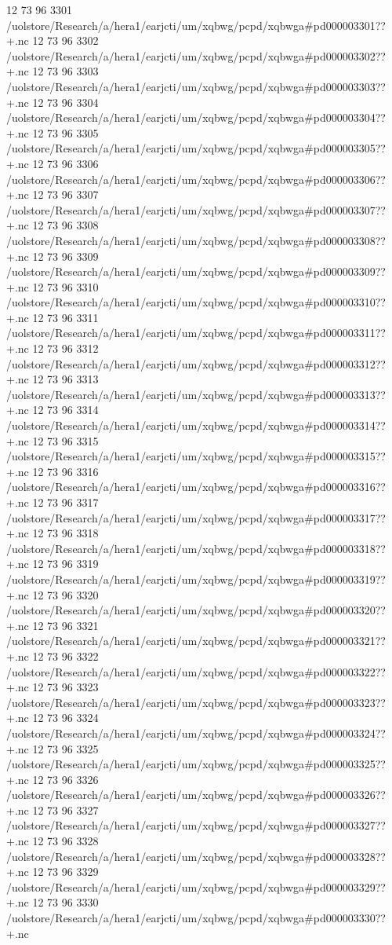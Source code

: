 12 73 96
3301
/uolstore/Research/a/hera1/earjcti/um/xqbwg/pcpd/xqbwga#pd000003301??+.nc
12 73 96
3302
/uolstore/Research/a/hera1/earjcti/um/xqbwg/pcpd/xqbwga#pd000003302??+.nc
12 73 96
3303
/uolstore/Research/a/hera1/earjcti/um/xqbwg/pcpd/xqbwga#pd000003303??+.nc
12 73 96
3304
/uolstore/Research/a/hera1/earjcti/um/xqbwg/pcpd/xqbwga#pd000003304??+.nc
12 73 96
3305
/uolstore/Research/a/hera1/earjcti/um/xqbwg/pcpd/xqbwga#pd000003305??+.nc
12 73 96
3306
/uolstore/Research/a/hera1/earjcti/um/xqbwg/pcpd/xqbwga#pd000003306??+.nc
12 73 96
3307
/uolstore/Research/a/hera1/earjcti/um/xqbwg/pcpd/xqbwga#pd000003307??+.nc
12 73 96
3308
/uolstore/Research/a/hera1/earjcti/um/xqbwg/pcpd/xqbwga#pd000003308??+.nc
12 73 96
3309
/uolstore/Research/a/hera1/earjcti/um/xqbwg/pcpd/xqbwga#pd000003309??+.nc
12 73 96
3310
/uolstore/Research/a/hera1/earjcti/um/xqbwg/pcpd/xqbwga#pd000003310??+.nc
12 73 96
3311
/uolstore/Research/a/hera1/earjcti/um/xqbwg/pcpd/xqbwga#pd000003311??+.nc
12 73 96
3312
/uolstore/Research/a/hera1/earjcti/um/xqbwg/pcpd/xqbwga#pd000003312??+.nc
12 73 96
3313
/uolstore/Research/a/hera1/earjcti/um/xqbwg/pcpd/xqbwga#pd000003313??+.nc
12 73 96
3314
/uolstore/Research/a/hera1/earjcti/um/xqbwg/pcpd/xqbwga#pd000003314??+.nc
12 73 96
3315
/uolstore/Research/a/hera1/earjcti/um/xqbwg/pcpd/xqbwga#pd000003315??+.nc
12 73 96
3316
/uolstore/Research/a/hera1/earjcti/um/xqbwg/pcpd/xqbwga#pd000003316??+.nc
12 73 96
3317
/uolstore/Research/a/hera1/earjcti/um/xqbwg/pcpd/xqbwga#pd000003317??+.nc
12 73 96
3318
/uolstore/Research/a/hera1/earjcti/um/xqbwg/pcpd/xqbwga#pd000003318??+.nc
12 73 96
3319
/uolstore/Research/a/hera1/earjcti/um/xqbwg/pcpd/xqbwga#pd000003319??+.nc
12 73 96
3320
/uolstore/Research/a/hera1/earjcti/um/xqbwg/pcpd/xqbwga#pd000003320??+.nc
12 73 96
3321
/uolstore/Research/a/hera1/earjcti/um/xqbwg/pcpd/xqbwga#pd000003321??+.nc
12 73 96
3322
/uolstore/Research/a/hera1/earjcti/um/xqbwg/pcpd/xqbwga#pd000003322??+.nc
12 73 96
3323
/uolstore/Research/a/hera1/earjcti/um/xqbwg/pcpd/xqbwga#pd000003323??+.nc
12 73 96
3324
/uolstore/Research/a/hera1/earjcti/um/xqbwg/pcpd/xqbwga#pd000003324??+.nc
12 73 96
3325
/uolstore/Research/a/hera1/earjcti/um/xqbwg/pcpd/xqbwga#pd000003325??+.nc
12 73 96
3326
/uolstore/Research/a/hera1/earjcti/um/xqbwg/pcpd/xqbwga#pd000003326??+.nc
12 73 96
3327
/uolstore/Research/a/hera1/earjcti/um/xqbwg/pcpd/xqbwga#pd000003327??+.nc
12 73 96
3328
/uolstore/Research/a/hera1/earjcti/um/xqbwg/pcpd/xqbwga#pd000003328??+.nc
12 73 96
3329
/uolstore/Research/a/hera1/earjcti/um/xqbwg/pcpd/xqbwga#pd000003329??+.nc
12 73 96
3330
/uolstore/Research/a/hera1/earjcti/um/xqbwg/pcpd/xqbwga#pd000003330??+.nc
